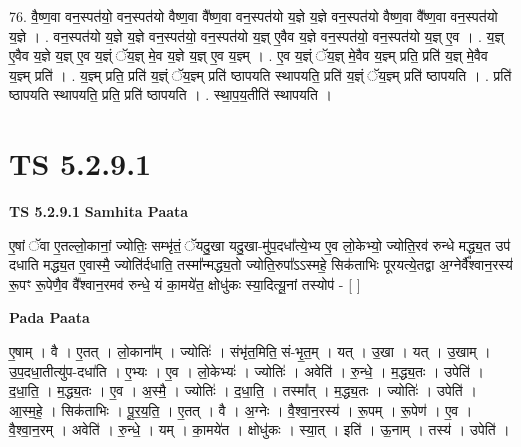\documentclass[17pt]{extarticle}
\begin{document}
76. वै॒ष्ण॒वा वन॒स्पत॑यो॒ वन॒स्पत॑यो वैष्ण॒वा वै᳚ष्ण॒वा वन॒स्पत॑यो य॒ज्ञे य॒ज्ञे वन॒स्पत॑यो वैष्ण॒वा वै᳚ष्ण॒वा वन॒स्पत॑यो य॒ज्ञे । . वन॒स्पत॑यो य॒ज्ञे य॒ज्ञे वन॒स्पत॑यो॒ वन॒स्पत॑यो य॒ज्ञ् ए॒वैव य॒ज्ञे वन॒स्पत॑यो॒ वन॒स्पत॑यो य॒ज्ञ् ए॒व । . य॒ज्ञ् ए॒वैव य॒ज्ञे य॒ज्ञ् ए॒व य॒ज्ञ्ं ॅय॒ज्ञ् मे॒व य॒ज्ञे य॒ज्ञ् ए॒व य॒ज्ञ्म् । . ए॒व य॒ज्ञ्ं ॅय॒ज्ञ् मे॒वैव य॒ज्ञ्म् प्रति॒ प्रति॑ य॒ज्ञ् मे॒वैव य॒ज्ञ्म् प्रति॑ । . य॒ज्ञ्म् प्रति॒ प्रति॑ य॒ज्ञ्ं ॅय॒ज्ञ्म् प्रति॑ ष्ठापयति स्थापयति॒ प्रति॑ य॒ज्ञ्ं ॅय॒ज्ञ्म् प्रति॑ ष्ठापयति । . प्रति॑ ष्ठापयति स्थापयति॒ प्रति॒ प्रति॑ ष्ठापयति । . स्था॒प॒य॒तीति॑ स्थापयति । \newline
\pagebreak
{}

\section{ TS 5.2.9.1 }

\textbf{TS 5.2.9.1 } \newline
\textbf{Samhita Paata} \newline

ए॒षां ॅवा ए॒तल्लो॒कानां॒ ज्योतिः॒ सम्भृ॑तं॒ ॅयदु॒खा यदु॒खा-मु॑प॒दधा᳚त्ये॒भ्य ए॒व लो॒केभ्यो॒ ज्योति॒रव॑ रुन्धे मद्ध्य॒त उप॑ दधाति मद्ध्य॒त ए॒वास्मै॒ ज्योति॑र्दधाति॒ तस्मा᳚न्मद्ध्य॒तो ज्योति॒रुपा᳚ऽऽस्महे॒ सिक॑ताभिः पूरयत्ये॒तद्वा अ॒ग्नेर्वै᳚श्वान॒रस्य॑ रू॒पꣳ रू॒पेणै॒व वै᳚श्वान॒रमव॑ रुन्धे॒ यं का॒मये॑त॒ क्षोधु॑कः स्या॒दित्यू॒नां तस्योप॑ - [  ] \newline

\textbf{Pada Paata} \newline

ए॒षाम् । वै । ए॒तत् । लो॒काना᳚म् । ज्योतिः॑ । संभृ॑त॒मिति॒ सं-भृ॒त॒म् । यत् । उ॒खा । यत् । उ॒खाम् । उ॒प॒दधा॒तीत्यु॑प-दधा॑ति । ए॒भ्यः । ए॒व । लो॒केभ्यः॑ । ज्योतिः॑ । अवेति॑ । रु॒न्धे॒ । म॒द्ध्य॒तः । उपेति॑ । द॒धा॒ति॒ । म॒द्ध्य॒तः । ए॒व । अ॒स्मै॒ । ज्योतिः॑ । द॒धा॒ति॒ । तस्मा᳚त् । म॒द्ध्य॒तः । ज्योतिः॑ । उपेति॑ । आ॒स्म॒हे॒ । सिक॑ताभिः । पू॒र॒य॒ति॒ । ए॒तत् । वै । अ॒ग्नेः । वै॒श्वा॒न॒रस्य॑ । रू॒पम् । रू॒पेण॑ । ए॒व । वै॒श्वा॒न॒रम् । अवेति॑ । रु॒न्धे॒ । यम् । का॒मये॑त । क्षोधु॑कः । स्या॒त् । इति॑ । ऊ॒नाम् । तस्य॑ । उपेति॑ ।  \newline
\end{document}
